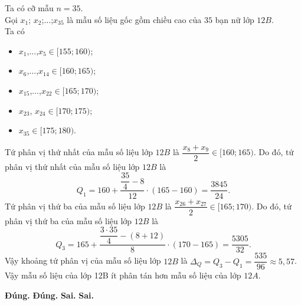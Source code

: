\begin{ex}
{\begin{enumerate}[1.]
		Ta có cỡ mẫu $n=35$.\\
		Gọi $x_1 $; $x_2 $;$\ldots $;$x_{35}$ là mẫu số liệu gốc gồm chiều cao của $35$ bạn nữ lớp $12B$.\\
		Ta có
		\begin{itemize}
			\item $x_1$,$\ldots$,$ x_5 \in[155; 160)$;
			\item $x_6$,$\ldots$,$ x_{14} \in[160; 165)$;
			\item $x_{15}$,$\ldots$,$ x_{22} \in[165; 170)$;
			\item $x_{23}$, $x_{24} \in[170; 175)$;
			\item $x_{35} \in[175; 180)$.
		\end{itemize}
		Tứ phân vị thứ nhất của mẫu số liệu lớp $12B$ là $\dfrac{x_8+x_9}{2}\in[160; 165)$. Do đó, tứ phân vị thứ nhất của mẫu số liệu lớp $12B$ là
		$$Q_1=160+\dfrac{\dfrac{35}{4}-8}{12}\cdot(165-160)=\dfrac{3845}{24}.$$
		Tứ phân vị thứ ba của mẫu số liệu lớp $12B$ là $\dfrac{x_{26}+x_{27}}{2}\in[165; 170)$. Do đó, tứ phân vị thứ ba của mẫu số liệu lớp $12B$ là
		$$Q_3=165+\dfrac{\dfrac{3 \cdot 35}{4}-(8+12)}{8}\cdot(170-165)=\dfrac{5305}{32}.$$
		Vậy khoảng tứ phân vị của mẫu số liệu lớp $12B$ là $\Delta_Q=Q_3-Q_1=\dfrac{535}{96} \approx 5{,}57$.\\
		Vậy mẫu số liệu của lớp 12B ít phân tán hơn mẫu số liệu của lớp $12A$.
	\end{enumerate}
	\begin{itemchoice}
		\itemch \textbf{Đúng.}
		\itemch \textbf{Đúng.}
		\itemch \textbf{Sai.}
		\itemch \textbf{Sai.}
	\end{itemchoice}
}
\end{ex}

